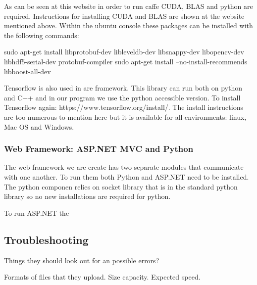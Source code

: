 \documentclass{scrreprt}
\begin{document}
As can be seen at this website in order to run caffe CUDA, BLAS and python are required.  Instructions for installing CUDA and BLAS are shown at the website mentioned above.  Within the ubuntu console these packages can be installed with the following commands:

sudo apt-get install libprotobuf-dev libleveldb-dev libsnappy-dev libopencv-dev libhdf5-serial-dev protobuf-compiler
sudo apt-get install --no-install-recommends libboost-all-dev


Tensorflow is also used in are framework.  This library can run both on python and C++ and in our program we use the python accessible version.  To install Tensorflow again: https://www.tensorflow.org/install/.  The install instructions are too numerous to mention here but it is available for all environments: linux, Mac OS and Windows.



\subsubsection{Web Framework: ASP.NET MVC and Python}
The web framework we are create has two separate modules that communicate with one another.  To run them both Python and ASP.NET need to be installed.  The python componen relies on socket library that is in the standard python library so no new installations are required for python.

To run ASP.NET the 


\subsection{Troubleshooting}
Things they should look out for an possible errors? 

Formats of files that they upload.  Size capacity. Expected speed.



\end{document}
